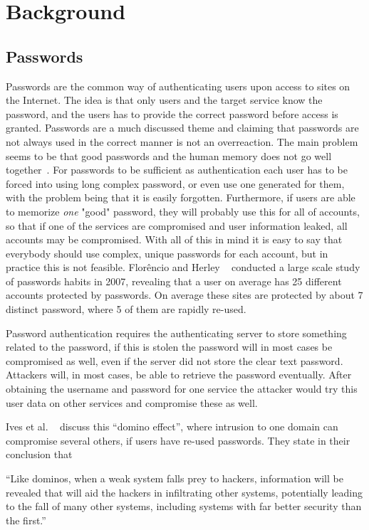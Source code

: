 \chapter{Background}\label{chp:background}


\section{Passwords}
Passwords are the common way of authenticating users upon access to sites on the Internet. The idea is that only users and the target service know the password, and the users has to provide the correct password before access is granted. Passwords are a much discussed theme and claiming that passwords are not always used in the correct manner is not an overreaction. The main problem seems to be that good passwords and the human memory does not go well together~\cite{memorability_yan}. For passwords to be sufficient as authentication each user has to be forced into using long complex password, or even use one generated for them, with the problem being that it is easily forgotten. Furthermore, if users are able to memorize \emph{one} "good" password, they will probably use this for all of accounts, so that if one of the services are compromised and user information leaked, all accounts may be compromised. With all of this in mind it is easy to say that everybody should use complex, unique passwords for each account, but in practice this is not feasible. Florêncio and Herley ~\cite{password-habits} conducted a large scale study of passwords habits in 2007, revealing that a user on average has 25 different accounts protected by passwords. On average these sites are protected by about 7 distinct password, where 5 of them are rapidly re-used.
\par Password authentication requires the authenticating server to store something related to the password, if this is stolen the password will in most cases be compromised as well, even if the server did not store the clear text password. Attackers will, in most cases, be able to retrieve the password eventually. After obtaining the username and password for one service the attacker would try this user data on other services and compromise these as well. 
\par Ives et al. ~\cite{domino-effect} discuss this ``domino effect'', where intrusion to one domain can compromise several others, if users have re-used passwords. They state in their conclusion that
\begin{displayquote}
``Like dominos, when a weak system falls prey to hackers, information will be revealed that will aid the hackers in infiltrating other systems, potentially leading to the fall of many other systems, including systems with far better security than the first.''
\end{displayquote}

